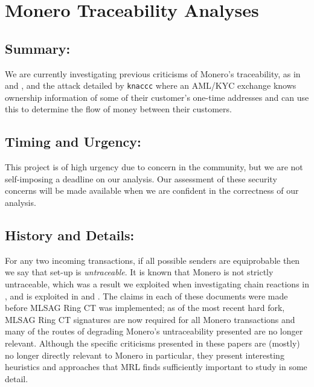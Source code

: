 \documentclass[12pt,english]{mrl}
\theoremstyle{definition}
\numberwithin{equation}{section}
\numberwithin{figure}{section}
\numberwithin{equation}{section}
\numberwithin{equation}{section}
\numberwithin{figure}{section}
\begin{document}
\section{Monero Traceability Analyses}

\subsection{Summary:} 

We are currently investigating previous criticisms of Monero's traceability, as in \cite{miller2017empirical} and \cite{kumar2017traceability}, and the attack detailed by \texttt{knaccc}  where an AML/KYC exchange knows ownership information of some of their customer's one-time addresses and can use this to determine the flow of money between their customers.

\subsection{Timing and Urgency:} 

This project is of high urgency due to concern in the community, but we are not self-imposing a deadline on our analysis. Our assessment of these security concerns will be made available when we are confident in the correctness of our analysis.

\subsection{History and Details:} 

For any two incoming transactions, if all possible senders are equiprobable then we say that set-up is \textit{untraceable}. It is known that Monero is not strictly untraceable, which was a result we exploited when investigating chain reactions in \cite{noether2014note}, and is exploited in \cite{miller2017empirical} and \cite{kumar2017traceability}. The claims in each of these documents were made before MLSAG Ring CT was implemented; as of the most recent hard fork, MLSAG Ring CT signatures are now required for all Monero transactions and many of the routes of degrading Monero's untraceability presented are no longer relevant. Although the specific criticisms presented in these papers are (mostly) no longer directly relevant to Monero in particular, they present interesting heuristics and approaches that MRL finds sufficiently important to study in some detail.
\end{document}
